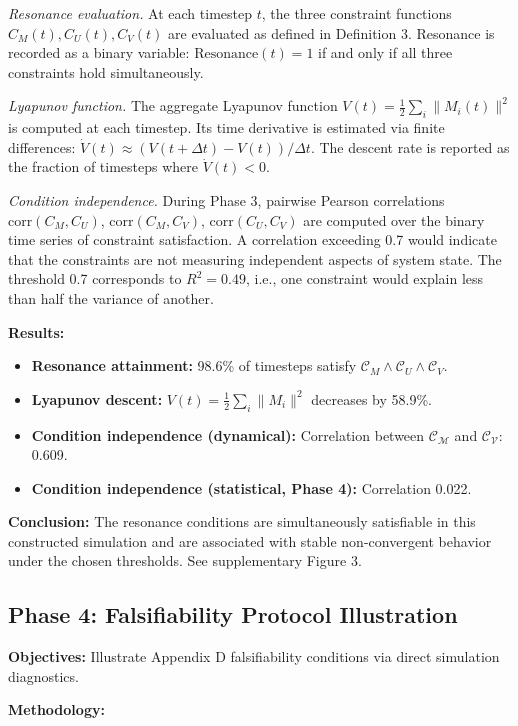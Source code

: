 \documentclass[11pt,a4paper]{article}
\theoremstyle{definition}
\begin{document}
\textit{Resonance evaluation.} At each timestep $t$, the three constraint functions $C_M(t), C_U(t), C_V(t)$ are evaluated as defined in Definition 3. Resonance is recorded as a binary variable: $\text{Resonance}(t) = 1$ if and only if all three constraints hold simultaneously.

\textit{Lyapunov function.} The aggregate Lyapunov function $V(t) = \frac{1}{2}\sum_i \|M_i(t)\|^2$ is computed at each timestep. Its time derivative is estimated via finite differences: $\dot{V}(t) \approx (V(t+\Delta t) - V(t))/\Delta t$. The descent rate is reported as the fraction of timesteps where $\dot{V}(t) < 0$.

\textit{Condition independence.} During Phase 3, pairwise Pearson correlations $\text{corr}(C_M, C_U)$, $\text{corr}(C_M, C_V)$, $\text{corr}(C_U, C_V)$ are computed over the binary time series of constraint satisfaction. A correlation exceeding 0.7 would indicate that the constraints are not measuring independent aspects of system state. The threshold 0.7 corresponds to $R^2 = 0.49$, i.e., one constraint would explain less than half the variance of another.

\textbf{Results:}
\begin{itemize}
\item \textbf{Resonance attainment:} 98.6\% of timesteps satisfy $\mathcal{C}_M \land \mathcal{C}_U \land \mathcal{C}_V$.
\item \textbf{Lyapunov descent:} $V(t) = \frac{1}{2}\sum_i \|M_i\|^2$ decreases by 58.9\%.
\item \textbf{Condition independence (dynamical):} Correlation between $\mathcal{C_M}$ and $\mathcal{C_V}$: 0.609.
\item \textbf{Condition independence (statistical, Phase 4):} Correlation 0.022.
\end{itemize}

\textbf{Conclusion:} The resonance conditions are simultaneously satisfiable in this constructed simulation and are associated with stable non-convergent behavior under the chosen thresholds. See supplementary Figure 3.

\subsection{Phase 4: Falsifiability Protocol Illustration}

\textbf{Objectives:} Illustrate Appendix D falsifiability conditions via direct simulation diagnostics.

\textbf{Methodology:}
\end{document}
